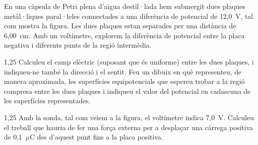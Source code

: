 En una càpsula de Petri plena d'aigua destil·lada hem submergit dues plaques metàl·liques paral·leles connectades a una diferència de potencial de 12,0~V, tal com mostra la figura. Les dues plaques estan separades per una distància de 6,00~cm. Amb un voltímetre, explorem la diferència de potencial entre la placa negativa i diferents punts de la regió intermèdia.


\begin{apartat}{1,25}
Calculeu el camp elèctric (suposant que és uniforme) entre les dues plaques, i indiqueu-ne també la direcció i el sentit. Feu un dibuix en què representeu, de manera aproximada, les superfícies equipotencials que espereu trobar a la regió compresa entre les dues plaques i indiqueu el valor del potencial en cadascuna de les superfícies representades.
\end{apartat}

\begin{apartat}{1,25}
Amb la sonda, tal com veiem a la figura, el voltímetre indica 7,0~V. Calculeu el treball que hauria de fer una força externa per a desplaçar una càrrega positiva de 0,1~$\mu$C des d'aquest punt fins a la placa positiva.
\end{apartat}
